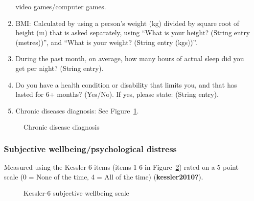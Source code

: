 \documentclass[
]{interact}
\begin{document}
\begin{enumerate}
  video games/computer games.
\item
  BMI: Calculated by using a person's weight (kg) divided by square root
  of height (m) that is asked separately, using ``What is your height?
  (String entry (metres))'', and ``What is your weight? (String entry
  (kgs))''.
\item
  During the past month, on average, how many hours of actual sleep did
  you get per night? (String entry).
\item
  Do you have a health condition or disability that limits you, and that
  has lasted for 6+ months? (Yes/No). If yes, please state: (String
  entry).
\item
  Chronic diseases diagnosis: See Figure~\ref{fig-chrondis}.
\end{enumerate}

\begin{figure}


\caption{\label{fig-chrondis}Chronic disease diagnosis}

\end{figure}%

\subsubsection{Subjective wellbeing/psychological
distress}\label{subjective-wellbeingpsychological-distress}

Measured using the Kessler-6 items (items 1-6 in
Figure~\ref{fig-Kess-6}) rated on a 5-point scale (0 = None of the time,
4 = All of the time) (\textbf{kessler2010?}).

\begin{figure}


\caption{\label{fig-Kess-6}Kessler-6 subjective wellbeing scale}

\end{figure}%
\end{document}

